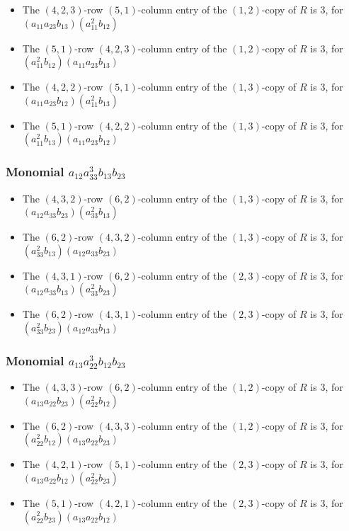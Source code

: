 \documentclass{article}
\begin{document}
\begin{itemize}
\item The $(4, 2, 3)$-row $(5, 1)$-column entry of the $ \left(1, 2\right) $-copy of $R$ is $ 3 $, for $( a_{11} a_{23} b_{13} )( a_{11}^{2} b_{12} )$ 
\item The $(5, 1)$-row $(4, 2, 3)$-column entry of the $ \left(1, 2\right) $-copy of $R$ is $ 3 $, for $( a_{11}^{2} b_{12} )( a_{11} a_{23} b_{13} )$ 
\item The $(4, 2, 2)$-row $(5, 1)$-column entry of the $ \left(1, 3\right) $-copy of $R$ is $ 3 $, for $( a_{11} a_{23} b_{12} )( a_{11}^{2} b_{13} )$ 
\item The $(5, 1)$-row $(4, 2, 2)$-column entry of the $ \left(1, 3\right) $-copy of $R$ is $ 3 $, for $( a_{11}^{2} b_{13} )( a_{11} a_{23} b_{12} )$ 
\end{itemize}
\subsubsection{Monomial $ a_{12} a_{33}^{3} b_{13} b_{23} $}

\begin{itemize}
\item The $(4, 3, 2)$-row $(6, 2)$-column entry of the $ \left(1, 3\right) $-copy of $R$ is $ 3 $, for $( a_{12} a_{33} b_{23} )( a_{33}^{2} b_{13} )$ 
\item The $(6, 2)$-row $(4, 3, 2)$-column entry of the $ \left(1, 3\right) $-copy of $R$ is $ 3 $, for $( a_{33}^{2} b_{13} )( a_{12} a_{33} b_{23} )$ 
\item The $(4, 3, 1)$-row $(6, 2)$-column entry of the $ \left(2, 3\right) $-copy of $R$ is $ 3 $, for $( a_{12} a_{33} b_{13} )( a_{33}^{2} b_{23} )$ 
\item The $(6, 2)$-row $(4, 3, 1)$-column entry of the $ \left(2, 3\right) $-copy of $R$ is $ 3 $, for $( a_{33}^{2} b_{23} )( a_{12} a_{33} b_{13} )$ 
\end{itemize}
\subsubsection{Monomial $ a_{13} a_{22}^{3} b_{12} b_{23} $}

\begin{itemize}
\item The $(4, 3, 3)$-row $(6, 2)$-column entry of the $ \left(1, 2\right) $-copy of $R$ is $ 3 $, for $( a_{13} a_{22} b_{23} )( a_{22}^{2} b_{12} )$ 
\item The $(6, 2)$-row $(4, 3, 3)$-column entry of the $ \left(1, 2\right) $-copy of $R$ is $ 3 $, for $( a_{22}^{2} b_{12} )( a_{13} a_{22} b_{23} )$ 
\item The $(4, 2, 1)$-row $(5, 1)$-column entry of the $ \left(2, 3\right) $-copy of $R$ is $ 3 $, for $( a_{13} a_{22} b_{12} )( a_{22}^{2} b_{23} )$ 
\item The $(5, 1)$-row $(4, 2, 1)$-column entry of the $ \left(2, 3\right) $-copy of $R$ is $ 3 $, for $( a_{22}^{2} b_{23} )( a_{13} a_{22} b_{12} )$ 
\end{itemize}
\end{document}
